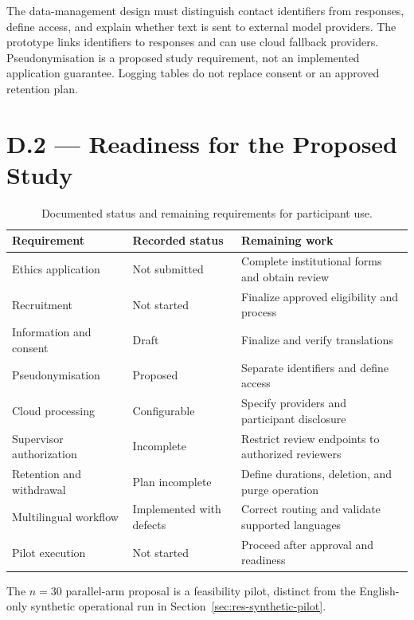 The data-management design must distinguish contact identifiers from
responses, define access, and explain whether text is sent to external
model providers. The prototype links identifiers to responses and can use
cloud fallback providers. Pseudonymisation is a proposed study requirement,
not an implemented application guarantee. Logging tables do not replace
consent or an approved retention plan.

\section*{D.2 --- Readiness for the Proposed Study}

\begin{table}[htbp]
\centering
\caption{Documented status and remaining requirements for participant use.}
\label{tab:app-ethics}
\small
\begin{tabularx}{\textwidth}{@{}>{\raggedright\arraybackslash}p{}p{}X@{}}
\toprule
\textbf{Requirement} & \textbf{Recorded status} & \textbf{Remaining work} \\
\midrule
Ethics application & Not submitted &
  Complete institutional forms and obtain review \\
Recruitment & Not started &
  Finalize approved eligibility and process \\
Information and consent & Draft &
  Finalize and verify translations \\
Pseudonymisation & Proposed &
  Separate identifiers and define access \\
Cloud processing & Configurable &
  Specify providers and participant disclosure \\
Supervisor authorization & Incomplete &
  Restrict review endpoints to authorized reviewers \\
Retention and withdrawal & Plan incomplete &
  Define durations, deletion, and purge operation \\
Multilingual workflow & Implemented with defects &
  Correct routing and validate supported languages \\
Pilot execution & Not started &
  Proceed after approval and readiness \\
\bottomrule
\end{tabularx}
\end{table}

The $n=30$ parallel-arm proposal is a feasibility pilot, distinct from
the English-only synthetic operational run in
Section~\ref{sec:res-synthetic-pilot}.

